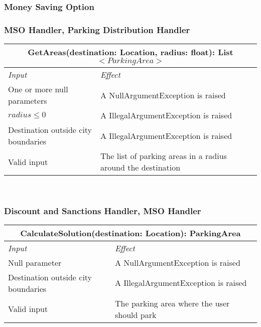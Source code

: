 	
	
	
	
	\subsubsection{Money Saving Option}
		
		
			
		\subsubsection*{MSO Handler, Parking Distribution Handler}
			\begin{tabular}{ |l|l| }
				\hline
				\multicolumn{2}{|c|}{GetAreas(destination: Location, radius: float): List$<ParkingArea>$}\\
				\hline
				\textit{Input} & \textit{Effect}\\ \hline
				One or more null parameters & A NullArgumentException is raised\\ \hline
				$radius \leq 0$ & A IllegalArgumentException is raised\\ \hline
				Destination outside city boundaries & A IllegalArgumentException is raised\\ \hline
				Valid input & The list of parking areas in a radius around the destination\\ \hline
			\end{tabular}
			\\
		
		
		
		\subsubsection*{Discount and Sanctions Handler, MSO Handler}
			\begin{tabular}{ |l|l| }
				\hline
				\multicolumn{2}{|c|}{CalculateSolution(destination: Location): ParkingArea}\\
				\hline
				\textit{Input} & \textit{Effect}\\ \hline
				Null parameter & A NullArgumentException is raised\\ \hline
				Destination outside city boundaries & A IllegalArgumentException is raised\\ \hline
				Valid input & The parking area where the user should park\\ \hline
			\end{tabular}
			\\
		
	
	
